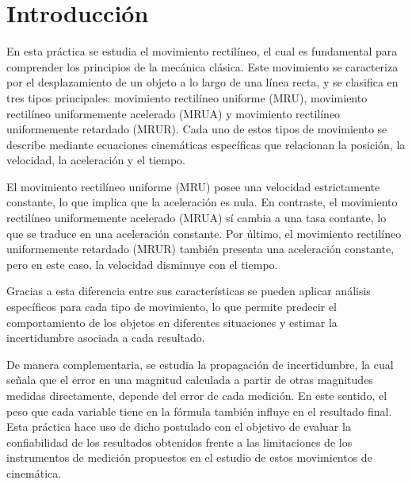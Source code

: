 \chapter{Introducción}
\thispagestyle{fancy}
\label{ch:introduccion}

En esta práctica se estudia el movimiento rectilíneo, el cual es fundamental para comprender los
principios de la mecánica clásica. Este movimiento 
se caracteriza por el desplazamiento de un objeto a lo largo de una línea recta,
y se clasifica en tres tipos principales: movimiento rectilíneo uniforme (MRU), 
movimiento rectilíneo uniformemente acelerado (MRUA)
y movimiento rectilíneo uniformemente retardado (MRUR). Cada uno de estos tipos 
de movimiento se describe mediante ecuaciones 
cinemáticas específicas que relacionan la posición, la velocidad, la 
aceleración y el tiempo.

El movimiento rectilíneo uniforme (MRU) posee una velocidad estrictamente 
constante, lo que 
implica que la aceleración es nula. En contraste, el movimiento rectilíneo 
uniformemente acelerado (MRUA) sí cambia a una tasa contante, lo 
que se traduce en una aceleración constante. Por último, el movimiento 
rectilíneo uniformemente retardado (MRUR) también presenta una aceleración 
constante, 
pero en este caso, la velocidad disminuye con el tiempo.

Gracias a esta diferencia entre sus características se pueden aplicar análisis 
específicos para cada tipo de movimiento, 
lo que permite predecir el comportamiento de los objetos en 
diferentes situaciones y estimar la incertidumbre asociada a cada resultado.

De manera complementaria, se estudia la propagación de incertidumbre, 
la cual señala que el error en una magnitud calculada a partir de otras 
magnitudes medidas directamente, 
depende del error de cada medición. En este sentido, 
el peso que cada variable tiene en la fórmula también influye en el 
resultado final. Esta práctica hace uso de dicho postulado 
con el objetivo de evaluar la 
confiabilidad de los resultados obtenidos 
frente a las limitaciones de los instrumentos de medición propuestos en el estudio 
de estos movimientos de cinemática.
